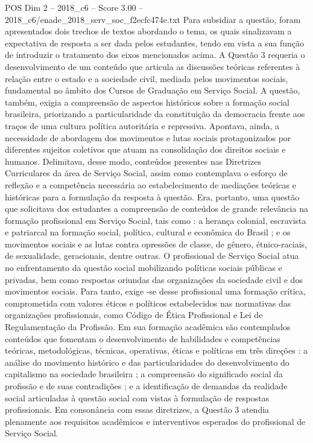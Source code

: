 \begin{textsample}{POS Dim 2 – 2018\_c6 – Score 3.00 – 2018\_c6/enade\_2018\_serv\_soc\_f2ecfc474e.txt}
Para subsidiar a questão, foram apresentados dois trechos de textos abordando o tema, os quais sinalizavam a expectativa de resposta a ser dada pelos estudantes, tendo em vista a sua função de introduzir o tratamento dos eixos mencionados acima.
A Questão 3 requeria o desenvolvimento de um conteúdo que articula as discussões teóricas referentes à relação entre o estado e a sociedade civil, mediada pelos movimentos sociais, fundamental no âmbito dos Cursos de Graduação em Serviço Social.
A questão, também, exigia a compreensão de aspectos históricos sobre a formação social brasileira, priorizando a particularidade da constituição da democracia frente aos traços de uma cultura política autoritária e repressiva.
Apontava, ainda, a necessidade de abordagem dos movimentos e lutas sociais protagonizados por diferentes sujeitos coletivos que atuam na consolidação dos direitos sociais e humanos.
Delimitava, desse modo, conteúdos presentes nas Diretrizes Curriculares da área de Serviço Social, assim como contemplava o esforço de reflexão e a competência necessária ao estabelecimento de mediações teóricas e históricas para a formulação da resposta à questão.
Era, portanto, uma questão que solicitava dos estudantes a compreensão de conteúdos de grande relevância na formação profissional em Serviço Social, tais como : a herança colonial, escravista e patriarcal na formação social, política, cultural e econômica do Brasil ; e os movimentos sociais e as lutas contra opressões de classe, de gênero, étnico-raciais, de sexualidade, geracionais, dentre outras.
O profissional de Serviço Social atua no enfrentamento da questão social mobilizando políticas sociais públicas e privadas, bem como respostas oriundas das organizações da sociedade civil e dos movimentos sociais.
Para tanto, exige -se desse profissional uma formação crítica, comprometida com valores éticos e políticos estabelecidos nas normativas das organizações profissionais, como Código de Ética Profissional e Lei de Regulamentação da Profissão.
Em sua formação acadêmica são contemplados conteúdos que fomentam o desenvolvimento de habilidades e competências teóricas, metodológicas, técnicas, operativas, éticas e políticas em três direções : a análise do movimento histórico e das particularidades do desenvolvimento do capitalismo na sociedade brasileira ; a compreensão do significado social da profissão e de suas contradições ; e a identificação de demandas da realidade social articuladas à questão social com vistas à formulação de respostas profissionais.
Em consonância com essas diretrizes, a Questão 3 atendia plenamente aos requisitos acadêmicos e interventivos esperados do profissional de Serviço Social.

\end{textsample}
